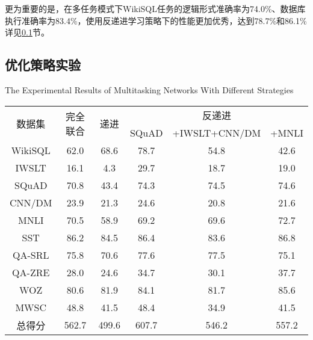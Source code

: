 更为重要的是，在多任务模式下WikiSQL任务的逻辑形式准确率为74.0\%、数据库执行准确率为83.4\%，使用反递进学习策略下的性能更加优秀，达到78.7\%和86.1\%详见\ref{cnl2sql:btyhclxdsyjg}节。

\subsection{优化策略实验}
\label{cnl2sql:btyhclxdsyjg}

\begin{table}[!htpb]
    {The Experimental Results of Multitasking Networks With Different Strategies}
  \label{tab:drwwlzbtxlclxdsyjg}
  \centering
  \begin{threeparttable}[b]
     \begin{tabular}{cccccc}
      \toprule
      \multirow{2}{18mm}{数据集}&\multirow{2}{18mm}{完全联合}&\multirow{2}{18mm}{递进} & \multicolumn{3}{c}{反递进}\\
      \cmidrule(lr){4-6}
      & & & SQuAD & +IWSLT+CNN/DM & +MNLI\\
      \midrule
      WikiSQL & 62.0 & 68.6 & 78.7 & 54.8 & 42.6\\
      IWSLT & 16.1 & 4.3 & 29.7 & 18.7 & 19.0\\
      SQuAD & 70.8 & 43.4 & 74.3 & 74.5 & 74.6\\
      CNN/DM & 23.9 & 21.3 & 24.6 & 20.8 & 21.6\\
      MNLI & 70.5 & 58.9 & 69.2 & 69.6 & 72.7\\
      SST & 86.2 & 84.5 & 86.4 & 83.6 & 86.8\\
      QA-SRL & 75.8 & 70.6 & 77.6 & 77.5 & 75.1\\
      QA-ZRE & 28.0 & 24.6 & 34.7 & 30.1 & 37.7\\
      WOZ & 80.6 & 81.9 & 84.1 & 81.7 & 85.6\\
    
      MWSC & 48.8 & 41.5 & 48.4 & 34.9 & 41.5\\
      \midrule
      总得分 & 562.7 & 499.6 & 607.7 & 546.2 & 557.2\\
      \bottomrule
    \end{tabular}
  \end{threeparttable}
\end{table}


